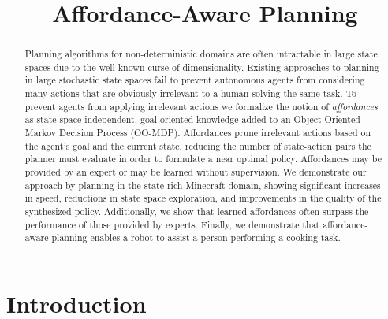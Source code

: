 \documentclass[letterpaper]{article}
\begin{document}
\title{Affordance-Aware Planning}


\maketitle

\begin{abstract}
Planning algorithms for non-deterministic domains are often
intractable in large state spaces due to the well-known curse of
dimensionality. Existing approaches to planning in large stochastic
state spaces fail to prevent autonomous agents from considering many
actions that are obviously irrelevant to a human solving the same
task. To prevent agents from applying irrelevant actions we formalize the notion of {\em affordances} as
state space independent, goal-oriented knowledge added to an Object Oriented Markov Decision
Process (OO-MDP).  Affordances prune irrelevant actions based on the agent's goal and
the current state, reducing the number of state-action pairs
the planner must evaluate in order to formulate a near optimal
policy. Affordances may be provided by an expert or may be learned without supervision.
We demonstrate our approach by planning in the state-rich Minecraft domain, showing significant increases in
speed, reductions in state space exploration, and improvements in the quality of the synthesized policy.
Additionally, we show that learned affordances often surpass the
performance of those provided by experts. Finally, we demonstrate that
affordance-aware planning enables a robot to assist a person performing a cooking task.
\end{abstract}


\section{Introduction}
\label{sec:introduction}
\end{document}
